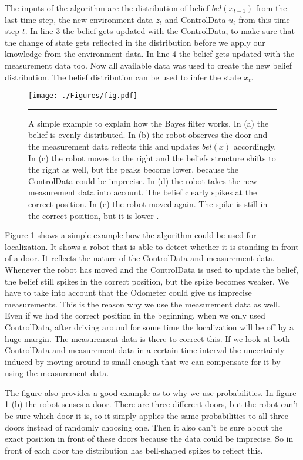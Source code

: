 The inputs of the algorithm are the distribution of belief $bel(x_{t-1})$ from the last time step, the new environment data $z_t$ and \gls{ControlData} $u_t$ from this time step $t$. In line 3 the belief gets updated with the \gls{ControlData}, to make sure that the change of state gets reflected in the distribution before we apply our knowledge from the environment data. In line 4 the belief gets updated with the measurement data too. Now all available data was used to create the new belief distribution. The belief distribution can be used to infer the state $x_t$. 

\begin{figure}[htbp]
	\centering
		\texttt{[image: ./Figures/fig.pdf]}
		\rule{35em}{0.5pt}
	\caption[Localization Example]{A simple example to explain how the Bayes filter works. In (a) the belief is evenly distributed. In (b) the robot observes the door and the measurement data reflects this and updates $bel(x)$ accordingly. In (c) the robot moves to the right and the beliefs structure shifts to the right as well, but the peaks become lower, because the \gls{ControlData} could be imprecise. In (d) the robot takes the new measurement data into account. The belief clearly spikes at the correct position. In (e) the robot moved again. The spike is still in the correct position, but it is lower \citep[p.\ 6]{Thrun:2005:PR:1121596}.}
	\label{fig:loc_example}
\end{figure}

Figure \ref{fig:loc_example} shows a simple example how the algorithm could be used for localization. It shows a robot that is able to detect whether it is standing in front of a door. It reflects the nature of the \gls{ControlData} and measurement data. Whenever the robot has moved and the \gls{ControlData} is used to update the belief, the belief still spikes in the correct position, but the spike becomes weaker. We have to take into account that the \gls{Odometer} could give us imprecise measurements. This is the reason why we use the measurement data as well. Even if we had the correct position in the beginning, when we only used \gls{ControlData}, after driving around for some time the localization will be off by a huge margin. The measurement data is there to correct this. If we look at both \gls{ControlData} and measurement data in a certain time interval the uncertainty induced by moving around is small enough that we can compensate for it by using the measurement data. 

The figure also provides a good example as to why we use probabilities. In figure \ref{fig:loc_example} (b) the robot senses a door. There are three different doors, but the robot can't be sure which door it is, so it simply applies the same probabilities to all three doors instead of randomly choosing one. Then it also can't be sure about the exact position in front of these doors because the data could be imprecise. So in front of each door the distribution has bell-shaped spikes to reflect this. 

